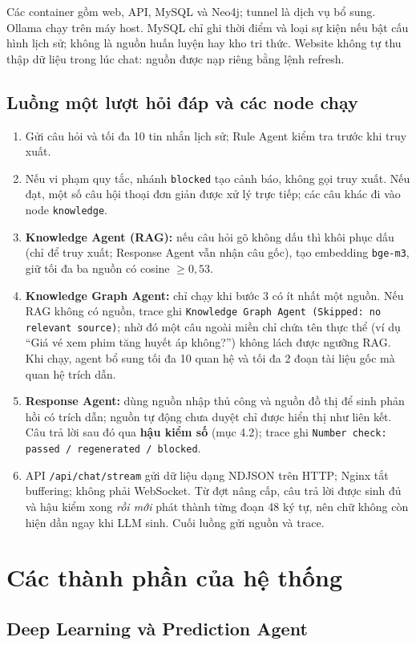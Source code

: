 \documentclass[12pt,a4paper]{article}
\renewcommand{\_}{\textunderscore\allowbreak}\setlength{\emergencystretch}{3em}
\begin{document}
Các container gồm web, API, MySQL và Neo4j; tunnel là dịch vụ bổ sung. Ollama chạy trên máy host. MySQL chỉ ghi thời điểm và loại sự kiện nếu bật cấu hình lịch sử; không là nguồn huấn luyện hay kho tri thức. Website không tự thu thập dữ liệu trong lúc chat: nguồn được nạp riêng bằng lệnh refresh.
\subsection{Luồng một lượt hỏi đáp và các node chạy}
\begin{enumerate}
\item Gửi câu hỏi và tối đa 10 tin nhắn lịch sử; Rule Agent kiểm tra trước khi truy xuất.
\item Nếu vi phạm quy tắc, nhánh \texttt{blocked} tạo cảnh báo, không gọi truy xuất. Nếu đạt, một số câu hội thoại đơn giản được xử lý trực tiếp; các câu khác đi vào node \texttt{knowledge}.
\item \textbf{Knowledge Agent (RAG):} nếu câu hỏi gõ không dấu thì khôi phục dấu (chỉ để truy xuất; Response Agent vẫn nhận câu gốc), tạo embedding \texttt{bge-m3}, giữ tối đa ba nguồn có cosine $\geq 0{,}53$.
\item \textbf{Knowledge Graph Agent:} chỉ chạy khi bước 3 có ít nhất một nguồn. Nếu RAG không có nguồn, trace ghi \texttt{Knowledge Graph Agent (Skipped: no relevant source)}; nhờ đó một câu ngoài miền chỉ chứa tên thực thể (ví dụ “Giá vé xem phim tăng huyết áp không?”) không lách được ngưỡng RAG. Khi chạy, agent bổ sung tối đa 10 quan hệ và tối đa 2 đoạn tài liệu gốc mà quan hệ trích dẫn.
\item \textbf{Response Agent:} dùng nguồn nhập thủ công và nguồn đồ thị để sinh phản hồi có trích dẫn; nguồn tự động chưa duyệt chỉ được hiển thị như liên kết. Câu trả lời sau đó qua \textbf{hậu kiểm số} (mục 4.2); trace ghi \texttt{Number check: passed / regenerated / blocked}.
\item API \texttt{/api/chat/stream} gửi dữ liệu dạng NDJSON trên HTTP; Nginx tắt buffering; không phải WebSocket. Từ đợt nâng cấp, câu trả lời được sinh đủ và hậu kiểm xong \emph{rồi mới} phát thành từng đoạn 48 ký tự, nên chữ không còn hiện dần ngay khi LLM sinh. Cuối luồng gửi nguồn và trace.
\end{enumerate}

\section{Các thành phần của hệ thống}
\subsection{Deep Learning và Prediction Agent}
\end{document}
